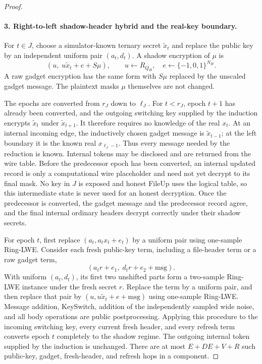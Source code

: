 \begin{proof}
\paragraph{3. Right-to-left shadow-header hybrid and the real-key boundary.}
For $t\in J$, choose a simulator-known ternary secret $\widetilde x_t$ and replace the public key by an independent uniform pair $(a_t,d_t)$. A shadow encryption of $\mu$ is
\[
 (u,\;u\widetilde x_t+e+S\mu),\qquad u\gets R_{Q_H},\quad e\gets\{-1,0,1\}^{N_H}.
\]
A raw gadget encryption has the same form with $S\mu$ replaced by the unscaled gadget message. The plaintext masks $\mu$ themselves are not changed.

The epochs are converted from $r_J$ down to $\ell_J$. For $t<r_J$, epoch $t+1$ has already been converted, and the outgoing switching key supplied by the induction encrypts $\widetilde x_t$ under $\widetilde x_{t+1}$. It therefore requires no knowledge of the real $x_t$. At an internal incoming edge, the inductively chosen gadget message is $\widetilde x_{t-1}$; at the left boundary it is the known real $x_{\ell_J-1}$. Thus every message needed by the reduction is known. Internal tokens may be disclosed and are returned from the wire table. Before the predecessor epoch has been converted, an internal updated record is only a computational wire placeholder and need not yet decrypt to its final mask. No key in $J$ is exposed and honest FileUp uses the logical table, so this intermediate state is never used for an honest decryption. Once the predecessor is converted, the gadget message and the predecessor record agree, and the final internal ordinary headers decrypt correctly under their shadow secrets.

For epoch $t$, first replace $(a_t,a_tx_t+e_t)$ by a uniform pair using one-sample Ring-LWE. Consider each fresh public-key term, including a file-header term or a raw gadget term,
\[
 (a_tr+e_1,\;d_tr+e_2+\mathrm{msg}).
\]
With uniform $(a_t,d_t)$, its first two unshifted parts form a two-sample Ring-LWE instance under the fresh secret $r$. Replace the term by a uniform pair, and then replace that pair by $(u,u\widetilde x_t+e+\mathrm{msg})$ using one-sample Ring-LWE. Message addition, KeySwitch, addition of the independently sampled wide noise, and all body operations are public postprocessing. Applying this procedure to the incoming switching key, every current fresh header, and every refresh term converts epoch $t$ completely to the shadow regime. The outgoing internal token supplied by the induction is unchanged. There are at most $E+DE+V+R$ such public-key, gadget, fresh-header, and refresh hops in a component.


\end{proof}
